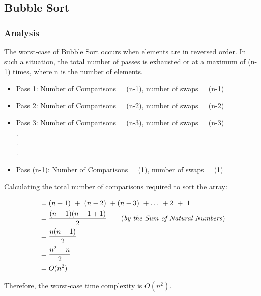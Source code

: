 \subsection{Bubble Sort}
\subsubsection{Analysis}

The worst-case of Bubble Sort occurs when elements are in reversed order. In such a situation, the total number of passes is exhausted or at a maximum of (n-1) times, where n is the number of elements.
\begin{itemize}
    \item Pass 1: Number of Comparisons = (n-1), number of swaps = (n-1)
    \item Pass 2: Number of Comparisons = (n-2), number of swaps = (n-2)    \item Pass 3: Number of Comparisons = (n-3), number of swaps = (n-3)\\
    .\\
    .\\
    .
\item Pass (n-1): Number of Comparisons = (1), number of swaps = (1)
\end{itemize}

Calculating the total number of comparisons required to sort the array:
\begin{center}
    \begin{align*}
        &= (n-1)\ +\ (n-2)\ + (n-3)\ +\dots\ + 2\ +\ 1\\
        &= \frac{(n-1)(n-1+1)}{2}\tag{\textit{by the Sum of Natural Numbers}}\\
        &= \frac{n(n-1)}{2}\\
        &= \frac{n^2 - n}{2}\\
        &= \textbf{\(O(n^2)\)}
    \end{align*}
\end{center}

Therefore, the worst-case time complexity is \(O(n^2)\).
